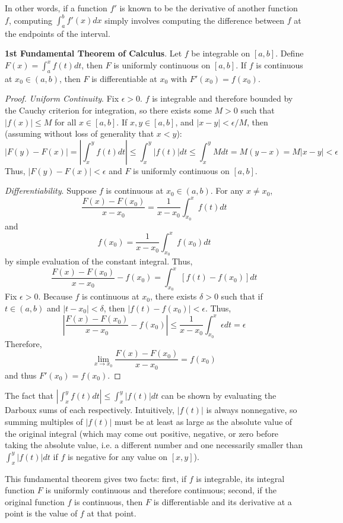In other words, if a function $f'$ is known to be the derivative of another function $f$, computing $\int_a^b f'(x)dx$ simply involves computing the difference between $f$ at the endpoints of the interval.

\newpage

\textbf{1st Fundamental Theorem of Calculus}. Let $f$ be integrable on $[a,b]$. Define $F(x)=\int_a^x f(t)dt$, then $F$ is uniformly continuous on $[a,b]$. If $f$ is continuous at $x_0\in(a,b)$, then $F$ is differentiable at $x_0$ with $F'(x_0) = f(x_0)$.

\begin{proof}
    \textit{Uniform Continuity}. Fix $\epsilon>0$. $f$ is integrable and therefore bounded by the Cauchy criterion for integration, so there exists some $M>0$ such that $|f(x)|\leq M$ for all $x\in[a,b]$.  If $x,y\in[a,b]$, and $|x-y|<\epsilon/M$, then (assuming without loss of generality that $x<y$): \[|F(y)-F(x)| = \left|\int_x^y f(t)dt\right| \leq \int_x^y |f(t)|dt\leq \int_x^y Mdt = M(y-x) = M|x-y| < \epsilon\] Thus, $|F(y)-F(x)|<\epsilon$ and $F$ is uniformly continuous on $[a,b]$.

    \textit{Differentiability}. Suppose $f$ is continuous at $x_0\in(a,b)$. For any $x\neq x_0$, \[\frac{F(x)-F(x_0)}{x-x_0} = \frac{1}{x-x_0}\int_{x_0}^x f(t)dt\] and \[f(x_0) = \frac{1}{x-x_0} \int_{x_0}^x f(x_0)dt\] by simple evaluation of the constant integral. Thus, \[\frac{F(x)-F(x_0)}{x-x_0} - f(x_0) = \int_{x_0}^x [f(t)-f(x_0)]dt\] Fix $\epsilon>0$. Because $f$ is continuous at $x_0$, there exists $\delta>0$ such that if $t\in(a,b)$ and $|t-x_0|<\delta$, then $|f(t)-f(x_0)|<\epsilon$. Thus, \[\left|\frac{F(x)-F(x_0)}{x-x_0} - f(x_0)\right| \leq \frac{1}{x-x_0}\int_{x_0}^x \epsilon dt = \epsilon\] Therefore, \[\lim_{x\to x_0}\frac{F(x)-F(x_0)}{x-x_0} = f(x_0)\] and thus $F'(x_0) = f(x_0)$.
\end{proof}

The fact that $\left|\int_x^y f(t)dt\right| \leq \int_x^y |f(t)|dt$ can be shown by evaluating the Darboux sums of each respectively. Intuitively, $|f(t)|$ is always nonnegative, so summing multiples of $|f(t)|$ must be at least as large as the absolute value of the original integral (which may come out positive, negative, or zero before taking the absolute value, i.e. a different number and one necessarily smaller than $\int_x^y |f(t)|dt$ if $f$ is negative for any value on $[x,y]$).

This fundamental theorem gives two facts: first, if $f$ is integrable, its integral function $F$ is uniformly continuous and therefore continuous; second, if the original function $f$ is continuous, then $F$ is differentiable and its derivative at a point is the value of $f$ at that point.
